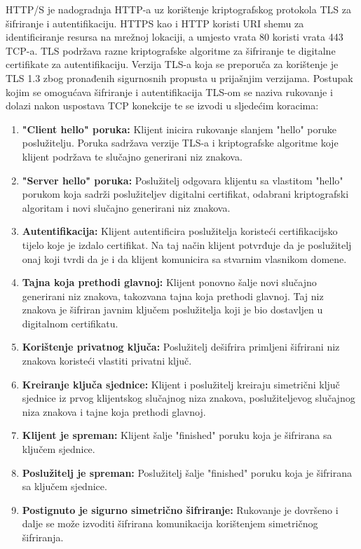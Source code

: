 \documentclass[times, utf8, diplomski]{fer}
\begin{document}
HTTP/S  je nadogradnja HTTP-a uz korištenje kriptografskog protokola TLS  za šifriranje i autentifikaciju. HTTPS kao i HTTP koristi URI shemu za identificiranje resursa na mrežnoj lokaciji, a umjesto vrata 80 koristi vrata 443 TCP-a. TLS podržava razne kriptografske algoritme za šifriranje te digitalne certifikate za autentifikaciju. Verzija TLS-a koja se preporuča za korištenje je TLS 1.3 zbog pronađenih sigurnosnih propusta u prijašnjim verzijama. Postupak kojim se omogućava šifriranje i autentifikacija TLS-om se naziva rukovanje i dolazi nakon uspostava TCP konekcije te se izvodi u sljedećim koracima\cite{TLS}:
\begin{enumerate}
    \item\textbf{"Client hello" poruka:} Klijent inicira rukovanje slanjem "hello" poruke poslužitelju. Poruka sadržava verzije TLS-a i kriptografske algoritme koje klijent podržava te slučajno generirani niz znakova.
    \item\textbf{"Server hello" poruka:} Poslužitelj odgovara klijentu sa vlastitom "hello" porukom koja sadrži poslužiteljev digitalni certifikat, odabrani kriptografski algoritam i novi slučajno generirani niz znakova.
    \item\textbf{Autentifikacija:} Klijent autentificira poslužitelja koristeći certifikacijsko tijelo koje je izdalo certifikat. Na taj način klijent potvrđuje da je poslužitelj onaj koji tvrdi da je i da klijent komunicira sa stvarnim vlasnikom domene.
    \item\textbf{Tajna koja prethodi glavnoj:} Klijent ponovno šalje novi slučajno generirani niz znakova, takozvana tajna koja prethodi glavnoj. Taj niz znakova je šifriran javnim ključem poslužitelja koji je bio dostavljen u digitalnom certifikatu.
    \item\textbf{Korištenje privatnog ključa:} Poslužitelj dešifrira primljeni šifrirani niz znakova koristeći vlastiti privatni ključ.
    \item\textbf{Kreiranje ključa sjednice:} Klijent i poslužitelj kreiraju simetrični ključ sjednice iz prvog klijentskog slučajnog niza znakova, poslužiteljevog slučajnog niza znakova i tajne koja prethodi glavnoj.
    \item\textbf{Klijent je spreman:} Klijent šalje "finished" poruku koja je šifrirana sa ključem sjednice.
    \item\textbf{Poslužitelj je spreman:} Poslužitelj šalje "finished" poruku koja je šifrirana sa ključem sjednice.
    \item\textbf{Postignuto je sigurno simetrično šifriranje:} Rukovanje je dovršeno i dalje se može izvoditi šifrirana komunikacija korištenjem simetričnog šifriranja.
\end{enumerate}
\end{document}

